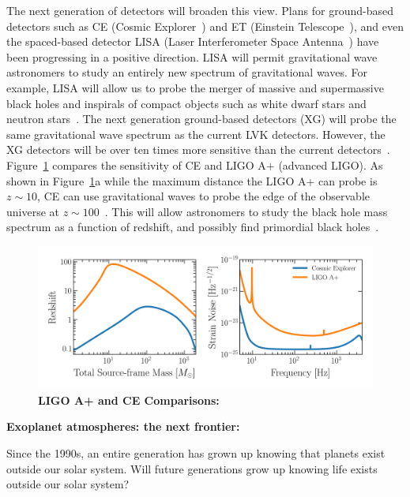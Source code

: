 The next generation  of detectors will broaden this view. 
Plans for ground-based detectors such as CE (Cosmic Explorer~\cite{Reitze:2019:BAAS}) and ET (Einstein Telescope~\cite{Maggiore:2020:JCAP}), and even the spaced-based detector LISA (Laser Interferometer Space Antenna~\cite{Amaro-Seoane:2017:arXiv}) have been progressing in a positive direction. 
LISA will permit gravitational wave astronomers to study an entirely new spectrum of gravitational waves. 
For example, LISA will allow us to probe the merger of massive and supermassive black holes and inspirals of compact objects such as white dwarf stars and neutron stars~\cite{Amaro-Seoane:2017:arXiv}. 
The next generation ground-based detectors (XG) will probe the same gravitational wave spectrum as the current LVK detectors. 
However, the XG detectors will be over ten times more sensitive than the current detectors~\cite{Reitze:2019:BAAS, Maggiore:2020:JCAP}. 
Figure~\ref{fig:ligo_vs_ce} compares the sensitivity of CE and LIGO A+ (advanced LIGO). 
As shown in Figure~\ref{fig:ligo_vs_ce}a while the maximum distance the LIGO A+ can probe is $z\sim10$, CE can use gravitational waves to probe the edge of the observable universe at $z\sim100$~\cite{Reitze:2019:BAAS}. 
This will allow astronomers to study the black hole mass spectrum as a function of redshift, and possibly find primordial black holes~\cite{Reitze:2019:BAAS}.
\begin{figure}
\begin{center}
  \centerline{\includegraphics[width=1.\linewidth]{src/figures/ligo_vs_ce.png}}
  \caption{\textbf{LIGO A+ and CE Comparisons:}  }
  \label{fig:ligo_vs_ce}
\end{center}
\end{figure}


\textbf{Exoplanet atmospheres: the next frontier:}

Since the 1990s, an entire generation has grown up knowing that planets exist outside our solar system. Will future generations grow up knowing life exists outside our solar system?

